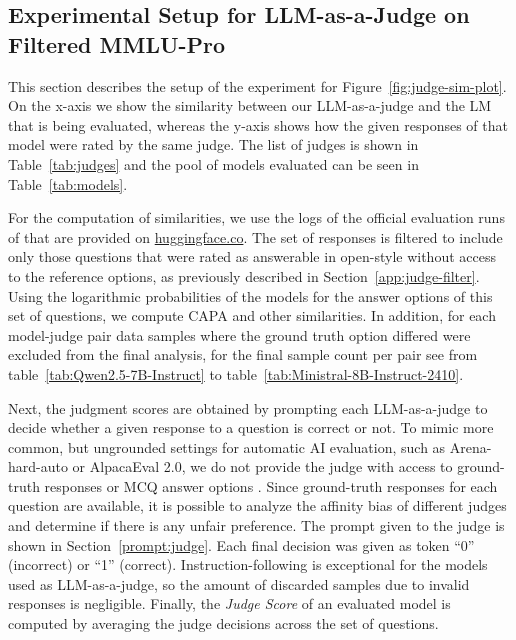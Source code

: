 \subsection{Experimental Setup for LLM-as-a-Judge on Filtered MMLU-Pro}

This section describes the setup of the experiment for Figure~\ref{fig:judge-sim-plot}. On the x-axis we show the similarity between our LLM-as-a-judge and the LM that is being evaluated, whereas the y-axis shows how the given responses of that model were rated by the same judge. The list of judges is shown in Table~\ref{tab:judges} and the pool of models evaluated can be seen in Table~\ref{tab:models}.

For the computation of similarities, we use the logs of the official evaluation runs of \citet{myrzakhan2024openllmleaderboard} that are provided on \hyperlink{huggingface.co}{huggingface.co}. The set of responses is filtered to include only those questions that were rated as answerable in open-style without access to the reference options, as previously described in Section~\ref{app:judge-filter}. Using the logarithmic probabilities of the models for the answer options of this set of questions, we compute CAPA and other similarities. In addition, for each model-judge pair data samples where the ground truth option differed were excluded from the final analysis, for the final sample count per pair see from table~\ref{tab:Qwen2.5-7B-Instruct} to table~\ref{tab:Ministral-8B-Instruct-2410}.

Next, the judgment scores are obtained by prompting each LLM-as-a-judge to decide whether a given response to a question is correct or not. To mimic more common, but ungrounded settings for automatic AI evaluation, such as Arena-hard-auto or AlpacaEval 2.0, we do not provide the judge with access to ground-truth responses or MCQ answer options \citep{li2024crowdsourceddatahighqualitybenchmarks, dubois2024length}. Since ground-truth responses for each question are available, it is possible to analyze the affinity bias of different judges and determine if there is any unfair preference. The prompt given to the judge is shown in Section~\ref{prompt:judge}.  Each final decision was given as token ``0'' (incorrect) or ``1'' (correct). Instruction-following is exceptional for the models used as LLM-as-a-judge, so the amount of discarded samples due to invalid responses is negligible. Finally, the \textit{Judge Score} of an evaluated model is computed by averaging the judge decisions across the set of questions.

